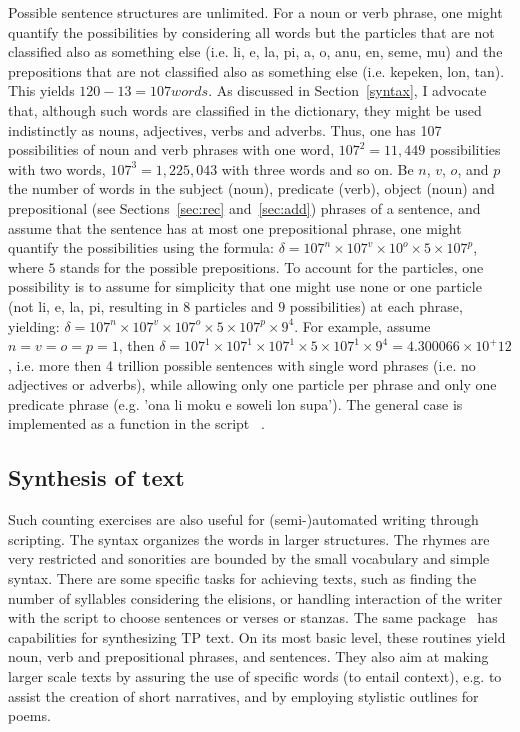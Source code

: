 Possible sentence structures are unlimited.
For a noun or verb phrase, one might quantify the possibilities
by considering all words but the particles that are not classified
also as something else
(i.e. li, e, la, pi, a, o, anu, en, seme, mu)
and the prepositions that are not classified also as something
else (i.e. kepeken, lon, tan).
This yields $120-13=107 words$.
As discussed in Section~\ref{syntax},
I advocate that, although such words are classified in the dictionary,
they might be used indistinctly as nouns, adjectives,
verbs and adverbs.
Thus, one has 107 possibilities of noun and verb phrases with
one word, $107^2=11,449$ possibilities with two words,
$107^3=1,225,043$ with three words and so on.
Be $n$, $v$, $o$, and $p$ the number of words in the subject (noun), predicate
(verb), object (noun) and prepositional (see Sections~\ref{sec:rec} and~\ref{sec:add}) phrases of a sentence,
and assume that the sentence has at most one prepositional phrase,
one might quantify the possibilities using the formula:
$\delta = 107^n\times 107^v\times 10^o \times 5\times 107^p$,
where $5$ stands for the possible prepositions.
To account for the particles, one possibility is
to assume for simplicity that one might use none or one particle
(not li, e, la, pi, resulting in $8$ particles and $9$ possibilities)
at each phrase, yielding:
$\delta = 107^n\times 107^v\times 107^o \times 5\times 107^p\times 9^4$.
For example, assume $n=v=o=p=1$, then
$\delta=107^1\times 107^1\times 107^1 \times 5\times 107^1\times 9^4=
 4.300066\times 10^+12$,
i.e. more then 4 trillion possible
sentences with single word phrases (i.e. no adjectives or adverbs),
while allowing only one particle per phrase
and only one predicate phrase
(e.g. 'ona li moku e soweli lon supa').
The general case is implemented as a function
in the script ~\cite{tokipona}.

\subsection{Synthesis of text}\label{synth}
Such counting exercises are also useful
for (semi-)automated writing through scripting.
The syntax organizes the words in larger structures.
The rhymes are very restricted and sonorities are
bounded by the small vocabulary and simple syntax.
There are some specific tasks for achieving texts,
such as finding the number of syllables considering the elisions,
or handling interaction of the writer with the script
to choose sentences or verses or stanzas.
The same package~\cite{tokipona}
has capabilities for synthesizing TP text.
On its most basic level, these routines yield
noun, verb and prepositional phrases,
and sentences.
They also aim at making larger scale texts
by assuring the use of specific words (to entail context),
e.g. to assist the creation of short narratives,
and by employing stylistic outlines for poems.


